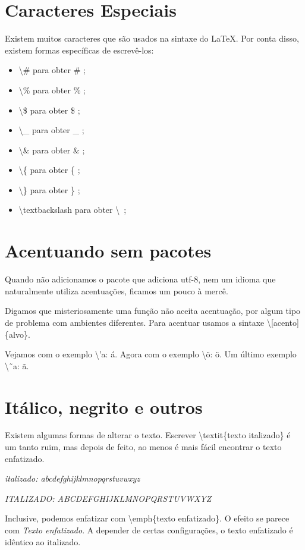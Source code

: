 \section{Caracteres Especiais}
Existem muitos caracteres que são usados na sintaxe do \LaTeX.
Por conta disso, existem formas específicas de escrevê-los:
\begin{itemize}
\item \textbackslash \# para obter \# ;
\item \textbackslash \% para obter \% ;
\item \textbackslash \$ para obter \$ ;
\item \textbackslash \_ para obter \_ ;
\item \textbackslash \& para obter \& ;
\item \textbackslash \{ para obter \{ ;
\item \textbackslash \} para obter \} ;
\item \textbackslash textbackslash para obter \textbackslash\ ;
\end{itemize}

\section{Acentuando sem pacotes}
Quando não adicionamos o pacote que adiciona utf-8,
nem um idioma que naturalmente utiliza acentuações,
ficamos um pouco à mercê.

Digamos que misteriosamente uma função não aceita acentuação,
por algum tipo de problema com ambientes diferentes.
Para acentuar usamos a sintaxe \textbackslash [acento] \{alvo\}.

Vejamos com o exemplo \textbackslash 'a: \'a.
Agora com o exemplo \textbackslash \"o: \"{o}.
Um último exemplo \textbackslash \~\ a: \~{a}.

\section{Itálico, negrito e outros}
Existem algumas formas de alterar o texto.
Escrever \textbackslash textit\{texto italizado\} é um tanto ruim,
mas depois de feito, ao menos é mais fácil encontrar o texto enfatizado.

\textit{italizado: abcdefghijklmnopqrstuvwxyz}

\textit{ITALIZADO: ABCDEFGHIJKLMNOPQRSTUVWXYZ}

Inclusive, podemos enfatizar com \textbackslash emph\{texto enfatizado\}.
O efeito se parece com \emph{Texto enfatizado}.
A depender de certas configurações, o texto enfatizado é idêntico ao italizado.

